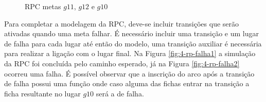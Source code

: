 \begin{figure}[ht]
  \centering
  \caption{RPC metas $g11$, $g12$ e $g10$}
  \label{fig:RPC-2}
\end{figure}

Para completar a modelagem da RPC, deve-se incluir transições que serão ativadas quando uma meta falhar. É necessário incluir uma transição e um lugar de falha para cada lugar até então do modelo, uma transição auxiliar é necessária para realizar a ligação com o lugar final. Na Figura \ref{fig:4-rp-falha1} a simulação da RPC foi concluída pelo caminho esperado, já na Figura \ref{fig:4-rp-falha2} ocorreu uma falha. É possível observar que a inscrição do arco após a transição de falha possui uma função onde caso alguma das fichas entrar na transição a ficha resultante no lugar $g10$ será a de falha.

